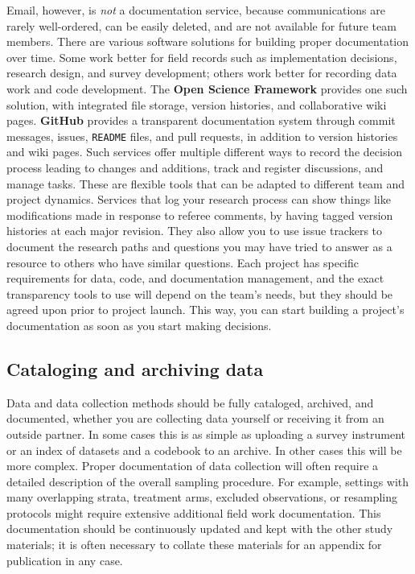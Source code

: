 Email, however, is \textit{not} a documentation service, because communications are rarely well-ordered,
can be easily deleted, and are not available for future team members.
There are various software solutions for building proper documentation over time.
Some work better for field records such as implementation decisions,
research design, and survey development;
others work better for recording data work and code development.
The \textbf{Open Science Framework} provides one such solution,
with integrated file storage, version histories, and collaborative wiki pages.
\textbf{GitHub} provides a transparent documentation system
through commit messages, issues, \texttt{README} files, and pull requests,
in addition to version histories and wiki pages.
Such services offer multiple different ways
to record the decision process leading to changes and additions,
track and register discussions, and manage tasks.
These are flexible tools that can be adapted to different team and project dynamics.
Services that log your research process can show things like modifications made in response to referee comments,
by having tagged version histories at each major revision.
They also allow you to use issue trackers
to document the research paths and questions you may have tried to answer
as a resource to others who have similar questions.
Each project has specific requirements for data, code, and documentation management,
and the exact transparency tools to use will depend on the team's needs,
but they should be agreed upon prior to project launch.
This way, you can start building a project's documentation as soon as you start making decisions.

\subsection{Cataloging and archiving data}

Data and data collection methods should be fully cataloged, archived, and documented,
whether you are collecting data yourself or receiving it from an outside partner.
In some cases this is as simple as uploading
a survey instrument or an index of datasets and a codebook to an archive.
In other cases this will be more complex.
Proper documentation of data collection will often require
a detailed description of the overall sampling procedure.
For example, settings with many overlapping strata,
treatment arms, excluded observations, or resampling protocols
might require extensive additional field work documentation.
This documentation should be continuously updated
and kept with the other study materials;
it is often necessary to collate these materials
for an appendix for publication in any case.

